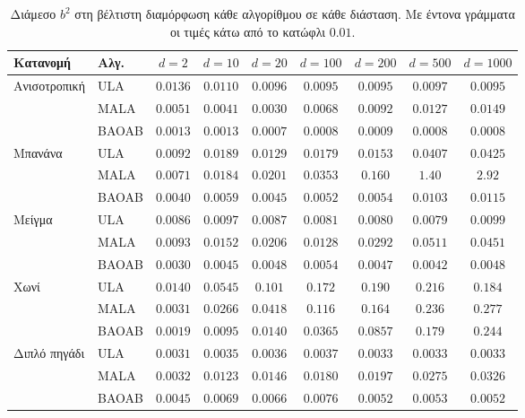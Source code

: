 \begin{table}[H]
\centering
\small
\begin{tabular}{llccccccc}
\toprule
Κατανομή & Αλγ. & $d{=}2$ & $d{=}10$ & $d{=}20$ & $d{=}100$ & $d{=}200$ & $d{=}500$ & $d{=}1000$ \\
\midrule
Ανισοτροπική & ULA   & $0.0136$ & $0.0110$ & $\mathbf{0.0096}$ & $\mathbf{0.0095}$ & $\mathbf{0.0095}$ & $\mathbf{0.0097}$ & $\mathbf{0.0095}$ \\
             & MALA  & $\mathbf{0.0051}$ & $\mathbf{0.0041}$ & $\mathbf{0.0030}$ & $\mathbf{0.0068}$ & $\mathbf{0.0092}$ & $0.0127$ & $0.0149$ \\
             & BAOAB & $\mathbf{0.0013}$ & $\mathbf{0.0013}$ & $\mathbf{0.0007}$ & $\mathbf{0.0008}$ & $\mathbf{0.0009}$ & $\mathbf{0.0008}$ & $\mathbf{0.0008}$ \\
\midrule
Μπανάνα      & ULA   & $\mathbf{0.0092}$ & $0.0189$ & $0.0129$ & $0.0179$ & $0.0153$ & $0.0407$ & $0.0425$ \\
             & MALA  & $\mathbf{0.0071}$ & $0.0184$ & $0.0201$ & $0.0353$ & $0.160$ & $1.40$ & $2.92$ \\
             & BAOAB & $\mathbf{0.0040}$ & $\mathbf{0.0059}$ & $\mathbf{0.0045}$ & $\mathbf{0.0052}$ & $\mathbf{0.0054}$ & $0.0103$ & $0.0115$ \\
\midrule
Μείγμα       & ULA   & $\mathbf{0.0086}$ & $\mathbf{0.0097}$ & $\mathbf{0.0087}$ & $\mathbf{0.0081}$ & $\mathbf{0.0080}$ & $\mathbf{0.0079}$ & $\mathbf{0.0099}$ \\
             & MALA  & $\mathbf{0.0093}$ & $0.0152$ & $0.0206$ & $0.0128$ & $0.0292$ & $0.0511$ & $0.0451$ \\
             & BAOAB & $\mathbf{0.0030}$ & $\mathbf{0.0045}$ & $\mathbf{0.0048}$ & $\mathbf{0.0054}$ & $\mathbf{0.0047}$ & $\mathbf{0.0042}$ & $\mathbf{0.0048}$ \\
\midrule
Χωνί         & ULA   & $0.0140$ & $0.0545$ & $0.101$ & $0.172$ & $0.190$ & $0.216$ & $0.184$ \\
             & MALA  & $\mathbf{0.0031}$ & $0.0266$ & $0.0418$ & $0.116$ & $0.164$ & $0.236$ & $0.277$ \\
             & BAOAB & $\mathbf{0.0019}$ & $\mathbf{0.0095}$ & $0.0140$ & $0.0365$ & $0.0857$ & $0.179$ & $0.244$ \\
\midrule
Διπλό πηγάδι & ULA   & $\mathbf{0.0031}$ & $\mathbf{0.0035}$ & $\mathbf{0.0036}$ & $\mathbf{0.0037}$ & $\mathbf{0.0033}$ & $\mathbf{0.0033}$ & $\mathbf{0.0033}$ \\
             & MALA  & $\mathbf{0.0032}$ & $0.0123$ & $0.0146$ & $0.0180$ & $0.0197$ & $0.0275$ & $0.0326$ \\
             & BAOAB & $\mathbf{0.0045}$ & $\mathbf{0.0069}$ & $\mathbf{0.0066}$ & $\mathbf{0.0076}$ & $\mathbf{0.0052}$ & $\mathbf{0.0053}$ & $\mathbf{0.0052}$ \\
\bottomrule
\end{tabular}
\caption{Διάμεσο $b^2$ στη βέλτιστη διαμόρφωση κάθε αλγορίθμου σε κάθε διάσταση. Με
έντονα γράμματα οι τιμές κάτω από το κατώφλι $0.01$.}
\label{tab:geo-dim}
\end{table}

